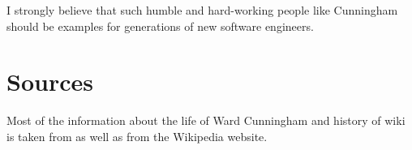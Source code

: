\documentclass[11pt]{article}
\begin{document}

\par


I strongly believe that such humble and hard-working people like Cunningham should be examples for generations of new software engineers.


\section{Sources}
Most of the information about the life of Ward Cunningham and history of wiki is taken from \cite{innovators} \cite{wiki-revolution} \cite{cs-encyclopedia} as well as from the Wikipedia website.

%

 
\end{document}
